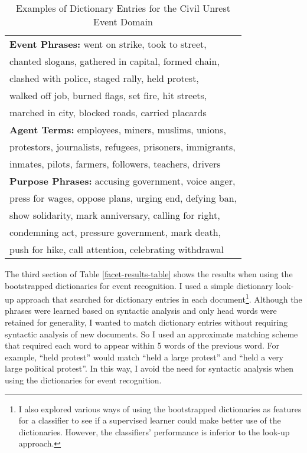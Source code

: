 \begin{table}[htbp]
\small
\centering
\begin{tabular}[center]{|l|} \hline
{\bf Event Phrases:} went on strike, took to street,\\
chanted slogans, gathered in capital, formed chain,\\
clashed with police, staged rally, held protest,\\
walked off job, burned flags, set fire, hit streets,\\  
marched in city,  blocked roads, carried placards\\ 
\hline
 {\bf Agent Terms:} employees, miners, muslims, unions,\\
protestors, journalists, refugees, prisoners, immigrants,\\
inmates, pilots, farmers, followers, teachers, drivers\\ 
\hline
{\bf Purpose Phrases:} accusing government, voice anger,\\
press for wages, oppose plans, urging end, defying ban,\\
show solidarity, mark anniversary, calling for right,\\
condemning act, pressure government, mark death,\\
push for hike, call attention, celebrating withdrawal\\ \hline

\end{tabular}
\caption{Examples of Dictionary Entries for the Civil Unrest Event Domain}
\label{sample-table}
\end{table}


The third section of Table \ref{facet-results-table} shows the results when
using the bootstrapped dictionaries for event recognition.  I used a
simple dictionary look-up approach that searched for dictionary
entries in each document\footnote{I also explored various ways of using the bootstrapped dictionaries as
features for a classifier to see if a supervised learner could
make better use of the dictionaries. 
However, the classifiers' performance is inferior to the look-up approach.}. 
Although the phrases were learned based on syntactic
analysis and only head words were retained for generality, I
wanted to match dictionary entries without requiring syntactic
analysis of new documents. So I used an approximate matching scheme that
required each word to appear within 5 words of the
previous word. For example, ``held protest'' would match ``held a
large protest'' and ``held a very large political protest''. In this way, 
I avoid the need for syntactic analysis when using the dictionaries
for event recognition. 


